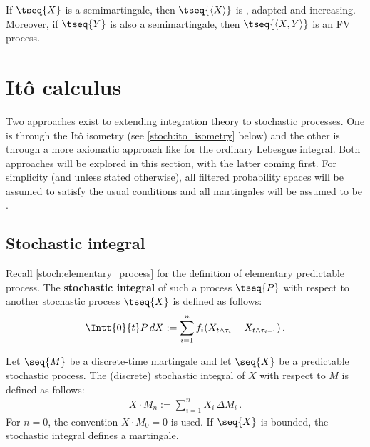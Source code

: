     \begin{property}
        If $\tseq{X}$ is a semimartingale, then $\tseq{\langle X \rangle}$ is \cdlgg, adapted and increasing. Moreover, if $\tseq{Y}$ is also a semimartingale, then $\tseq{\langle X,Y \rangle}$ is an FV process.
    \end{property}

\section{It\^o calculus}

    Two approaches exist to extending integration theory to stochastic processes. One is through the It\^o isometry (see \cref{stoch:ito_isometry} below) and the other is through a more axiomatic approach like for the ordinary Lebesgue integral. Both approaches will be explored in this section, with the latter coming first. For simplicity (and unless stated otherwise), all filtered probability spaces will be assumed to satisfy the usual conditions and all martingales will be assumed to be \cdlgg.

\subsection{Stochastic integral}

    Recall \cref{stoch:elementary_process} for the definition of elementary predictable process. The \textbf{stochastic integral} of such a process $\tseq{P}$ with respect to another stochastic process $\tseq{X}$ is defined as follows:
    \begin{gather}
        \label{stoch:elementary_integral}
        \Intt{0}{t}P\,dX := \sum_{i=1}^nf_i(X_{t\land\tau_i} - X_{t\land\tau_{i-1}})\,.
    \end{gather}

    \begin{example}
        Let $\seq{M}$ be a discrete-time martingale and let $\seq{X}$ be a predictable stochastic process. The (discrete) stochastic integral of $X$ with respect to $M$ is defined as follows:
        \begin{gather}
            X\cdot M_n := \sum_{i=1}^nX_i\,\Delta M_i\,.
        \end{gather}
        For $n=0$, the convention $X\cdot M_0=0$ is used. If $\seq{X}$ is bounded, the stochastic integral defines a martingale.
    \end{example}

